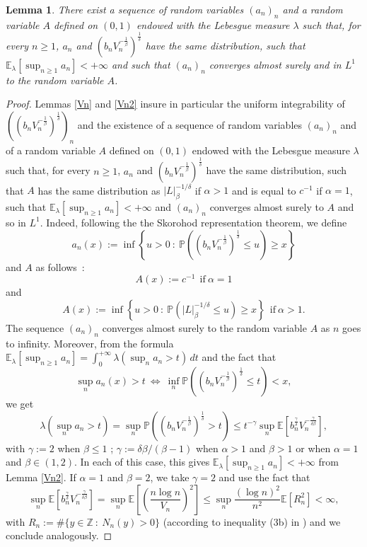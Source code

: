 \documentclass[oneside, a4paper,11pt,reqno]{amsart}
\newtheorem{lem}[hypo]{Lemma}
\begin{document}
\begin{lem}
There exist a sequence of random variables $(a_n)_n$ and a random variable
$A$ defined on $(0,1)$ endowed with the Lebesgue measure $\lambda$ such that, for every
$n\ge 1$, $a_n$ and $ (b_nV_n^{-\frac 1\beta})^{\frac 1{\delta}}$ have the same 
distribution, 
such that ${\mathbb E}_\lambda[\sup_{n\ge 1} a_n]<+\infty$
and such that $(a_n)_n$ converges almost surely and in $L^1$ to the random variable $A$.
\end{lem}
\begin{proof}
Lemmas   \ref{Vn} and \ref{Vn2}  insure in particular the uniform integrability of 
$\left( (b_n V_n^{-\frac 1{\beta}})^{\frac 1\delta}
\right)_n$ and the existence of
a sequence of random variables $(a_n)_n$ and of a random variable
$A$ defined on $(0,1)$ endowed with the Lebesgue measure $\lambda$ such that, for every
$n\ge 1$, $a_n$ and $ (b_n V_n^{-\frac 1\beta})^{\frac 1{\delta}}$ have the same 
distribution, such that $A$ has the same distribution
as  $|L|_\beta^{-1/\delta}$ if $\alpha>1$ and is equal to $c^{-1}$ if $\alpha=1$,
such that ${\mathbb  E}_\lambda[\sup_{n\ge 1}a_n]<+\infty$
and $(a_n)_n$ converges almost surely to $A$ and so in $L^1$. Indeed, following the
the Skorohod representation theorem, we define
$$a_n(x):=\inf\left\{u>0\ :\ {\mathbb P}\left( (b_nV_n^{-\frac 1{\beta}})^{\frac 1\delta}
  \le u\right)\ge x\right\}$$
and $A$ as follows~:
$$A(x):= c^{-1}\ \ \mbox{if}\ \alpha=1$$
and
$$A(x):= \inf\left\{u>0\ :\ {\mathbb P}\left( |L|_\beta^{-1/\delta}  \le u\right)\ge x\right\}
\ \ \mbox{if}\ \alpha>1.$$
The sequence $(a_n)_n$ converges almost surely to the random variable $A$ as $n$ goes to infinity. 
Moreover, from the formula
${\mathbb E}_\lambda[\sup_{n\ge 1}a_n]=\int_0^{+\infty}\lambda
(\sup_na_n>t) \, dt$
and the fact that
$$\sup_n a_n(x)>t\ \Leftrightarrow\ \inf_n {\mathbb P}\left( 
(b_n V_n^{-\frac 1\beta})^{\frac 1{\delta}}
\le t\right) <x,
$$
we get
$$\lambda(\sup_na_n>t) = \sup_n  {\mathbb P}\left( 
(b_nV_n^{-\frac 1 {\beta}})^{\frac 1\delta}
> t\right)\le t^{-\gamma}\sup_n
   {\mathbb E}\left[ b_n^{\frac\gamma\delta}V_n^{-\frac{\gamma}{\delta\beta}}
\right] ,$$
with $\gamma:=2$ when $\beta\le 1$ ;
$\gamma:=\delta\beta/(\beta-1)$ when $\alpha>1$ and $\beta >1$ or when $\alpha=1$ 
and $\beta\in(1,2)$. In each of this case, this gives 
${\mathbb E}_\lambda[\sup_{n\ge 1}a_n]<+\infty$ from Lemma \ref{Vn2}.
If $\alpha=1$ and $\beta=2$, we take $\gamma=2$ and use the fact that
$$ \sup_n{\mathbb E}\left[ b_n^{\frac\gamma\delta}V_n^{-\frac{\gamma}{\delta\beta}}
\right] = \sup_n {\mathbb E}\left[ \left(\frac{n\log n}{V_n}\right)^2
\right]\le \sup_n\frac {(\log n)^2}{n^2}{\mathbb E}[R_n^2]<\infty,$$
with $R_n:=\#\{y\in{\mathbb Z}\ :\ N_n(y)>0\}$ (according to 
inequality (3b) in \cite{LGR}) and we conclude analogously.
\end{proof}
\end{document}

